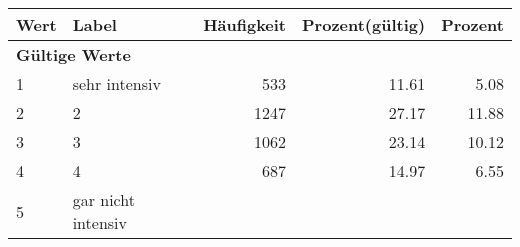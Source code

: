      \begin{longtable}{lXrrr}
     \toprule
     \textbf{Wert} & \textbf{Label} & \textbf{Häufigkeit} & \textbf{Prozent(gültig)} & \textbf{Prozent} \\
     \endhead
     \midrule
     \multicolumn{5}{l}{\textbf{Gültige Werte}}\\

     1 &
     \multicolumn{1}{X}{ sehr intensiv   } &


       \num{533} &
       \num[round-mode=places,round-precision=2]{11,61} &
         \num[round-mode=places,round-precision=2]{5,08} \\

     2 &
     \multicolumn{1}{X}{ 2   } &


       \num{1247} &
       \num[round-mode=places,round-precision=2]{27,17} &
         \num[round-mode=places,round-precision=2]{11,88} \\

     3 &
     \multicolumn{1}{X}{ 3   } &


       \num{1062} &
       \num[round-mode=places,round-precision=2]{23,14} &
         \num[round-mode=places,round-precision=2]{10,12} \\

     4 &
     \multicolumn{1}{X}{ 4   } &


       \num{687} &
       \num[round-mode=places,round-precision=2]{14,97} &
         \num[round-mode=places,round-precision=2]{6,55} \\

     5 &
     \multicolumn{1}{X}{ gar nicht intensiv   } &



\end{longtable}

